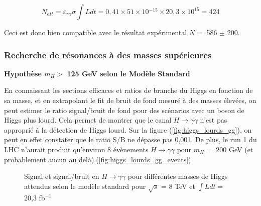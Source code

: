 \documentclass[11pt]{article} %
\begin{document}
\begin{equation}
N_{att} = \varepsilon_{\gamma\gamma} \sigma \int L dt = 0,41 \times 51 \times  \mbox{10} {}^{-15} \times 20,3 \times 10^{15} = 424
\end{equation}

Ceci est donc bien compatible avec le résultat expérimental $N =$ 586 $\pm$ 200.



\subsubsection{Recherche de résonances à des masses supérieures }

\textbf{Hypothèse $m_H >$ 125 GeV selon le Modèle Standard}

En connaissant les sections efficaces et ratios de branche du Higgs en fonction de sa masse, et en extrapolant le fit de bruit de fond mesuré à des masses élevées, on peut estimer le ratio signal/bruit de fond pour des scénarios avec un boson de Higgs plus lourd. Cela permet de montrer que le canal $H \to \gamma \gamma$ n'est pas approprié à la détection de Higgs lourd. Sur la figure  (\ref{fig:higgs_lourds_gg}), on peut en effet constater que le ratio S/B ne dépasse pas 0,001. De plus, le run 1 du LHC n'aurait produit qu'environ 8 évènements $H \to \gamma \gamma$ pour $m_H =$ 200 GeV (et probablement aucun au delà).(\ref{fig:higgs_lourds_gg_events})
\begin{figure}[H]
\begin{subfigure}[b]{.5\linewidth}
\centering
 \resizebox{1.1\linewidth}{!}{}
\end{subfigure}%
\begin{subfigure}[b]{.5\linewidth}
\centering
 \resizebox{1.1\linewidth}{!}{}
\end{subfigure}
\caption{Signal et signal/bruit en $H\to\gamma\gamma$ pour différentes masses de Higgs attendus selon le modèle standard pour $\sqrt{s}$ = 8 TeV et $\int Ldt =$ 20,3 fb${}^{-1}$ }
\end{figure}
\end{document}
